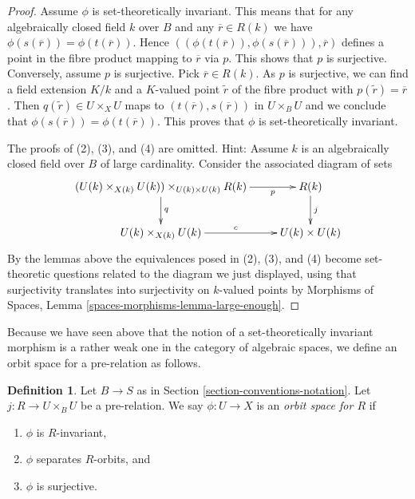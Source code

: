 \documentclass{stacks-project}
\theoremstyle{plain}
\theoremstyle{definition}
\newtheorem{definition}[subsection]{Definition}
\theoremstyle{remark}
\numberwithin{equation}{subsection}
\begin{document}
\begin{proof}
Assume $\phi$ is set-theoretically invariant. This means that for any
algebraically closed field $k$ over $B$ and any $\overline{r} \in R(k)$
we have $\phi(s(\overline{r})) = \phi(t(\overline{r}))$. Hence
$((\phi(t(\overline{r})), \phi(s(\overline{r}))), \overline{r})$
defines a point in the fibre product mapping to $\overline{r}$ via
$p$. This shows that $p$ is surjective. Conversely, assume $p$ is
surjective. Pick $\overline{r} \in R(k)$. As $p$ is surjective, we
can find a field extension $K/k$ and a $K$-valued point
$\tilde r$ of the fibre product with $p(\tilde r) = \overline{r}$.
Then $q(\tilde r) \in U \times_X U$ maps to
$(t(\overline{r}), s(\overline{r}))$ in $U \times_B U$ and we conclude
that $\phi(s(\overline{r})) = \phi(t(\overline{r}))$. This proves
that $\phi$ is set-theoretically invariant.

\medskip\noindent
The proofs of (2), (3), and (4) are omitted. Hint: Assume $k$ is an
algebraically closed field over $B$ of large cardinality. Consider the
associated diagram of sets
$$
\xymatrix{
(U(k) \times_{X(k)} U(k)) \times_{U(k) \times U(k)} R(k) \ar[d]^q \ar[r]_-p &
R(k) \ar[d]^j \\
U(k) \times_{X(k)} U(k) \ar[r]^c & U(k) \times U(k)
}
$$
By the lemmas above the equivalences posed in (2), (3), and (4) become
set-theoretic questions related to the diagram we just displayed, using
that surjectivity translates into surjectivity on $k$-valued points by
Morphisms of Spaces, Lemma \ref{spaces-morphisms-lemma-large-enough}.
\end{proof}

\noindent
Because we have seen above that the notion of a set-theoretically
invariant morphism is a rather weak one in the category of algebraic
spaces, we define an orbit space for a pre-relation as follows.

\begin{definition}
\label{definition-orbit-space}
Let $B \to S$ as in Section \ref{section-conventions-notation}.
Let $j : R \to U \times_B U$ be a pre-relation.
We say $\phi : U \to X$ is an {\it orbit space for $R$} if
\begin{enumerate}
\item $\phi$ is $R$-invariant,
\item $\phi$ separates $R$-orbits, and
\item $\phi$ is surjective.
\end{enumerate}
\end{definition}
\end{document}
